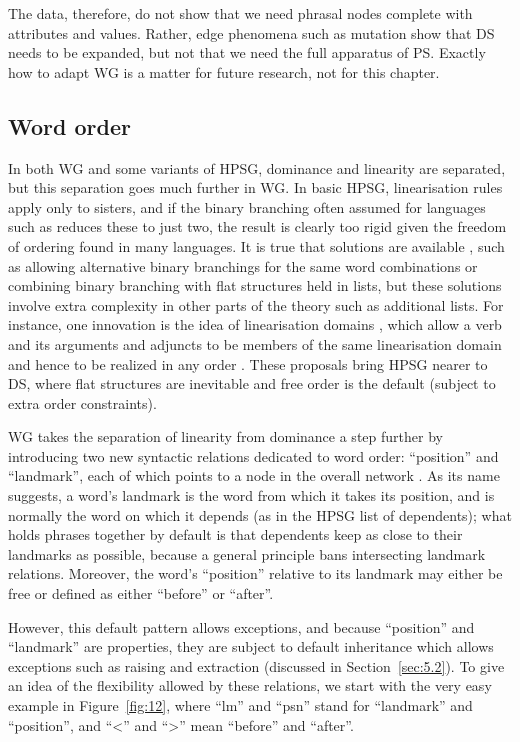 \documentclass[output=paper
 	        ,biblatex
                ,babelshorthands
                ,newtxmath
                ,draftmode
                ,colorlinks, citecolor=brown
]{langscibook}
\begin{document}
The  data, therefore, do not show that we need phrasal nodes complete with attributes and values. Rather, edge phenomena such as  mutation show that DS needs to be expanded, but not that we need the full apparatus of PS. Exactly how to adapt WG is a matter for future research, not for this chapter.


\subsection{Word order}
\label{sec:4.4}

In both WG and some variants of HPSG, dominance and linearity are separated, but this separation goes much further in WG. In basic HPSG, linearisation rules apply only to sisters, and if the binary branching often assumed for languages such as  \citep[Section~10.3]{MuellerGT-Eng2} reduces these to just two, the result is clearly too rigid given the freedom of ordering found in many languages. It is true that solutions are available \citep[Chapter~10]{MuellerGT-Eng2}, such as allowing alternative binary branchings for the same word combinations or combining binary branching with flat structures held in lists, but these solutions involve extra complexity in other parts of the theory such as additional lists. For instance, one innovation is the idea of linearisation domains \citep{Reape94a,Kathol2000a,Babel}, which allow a verb and its arguments and adjuncts to be members of the same linearisation domain and hence to be realized in any order \citep[302]{MuellerGT-Eng2}. These proposals bring HPSG nearer to DS, where flat structures are inevitable and free order is the default (subject to extra order constraints).

WG takes the separation of linearity from dominance a step further by introducing two new syntactic relations dedicated to word order: ``position'' and ``landmark'', each of which points to a node in the overall network \citep{Hudson2018a}. As its name suggests, a word’s landmark is the word from which it takes its position, and is normally the word on which it depends (as in the HPSG list of dependents); what holds phrases together by default is that dependents keep as close to their landmarks as possible, because a general principle bans intersecting landmark relations. Moreover, the word’s ``position'' relative to its landmark may either be free or defined as either ``before'' or ``after''.

However, this default pattern allows exceptions, and because ``position'' and ``landmark'' are properties, they are subject to default inheritance which allows exceptions such as raising and extraction (discussed in Section~\ref{sec:5.2}). To give an idea of the flexibility allowed by these relations, we start with the very easy  example in Figure~\ref{fig:12}, where ``lm'' and ``psn'' stand for ``landmark'' and ``position'', and ``<'' and ``>'' mean ``before'' and ``after''.
\end{document}
